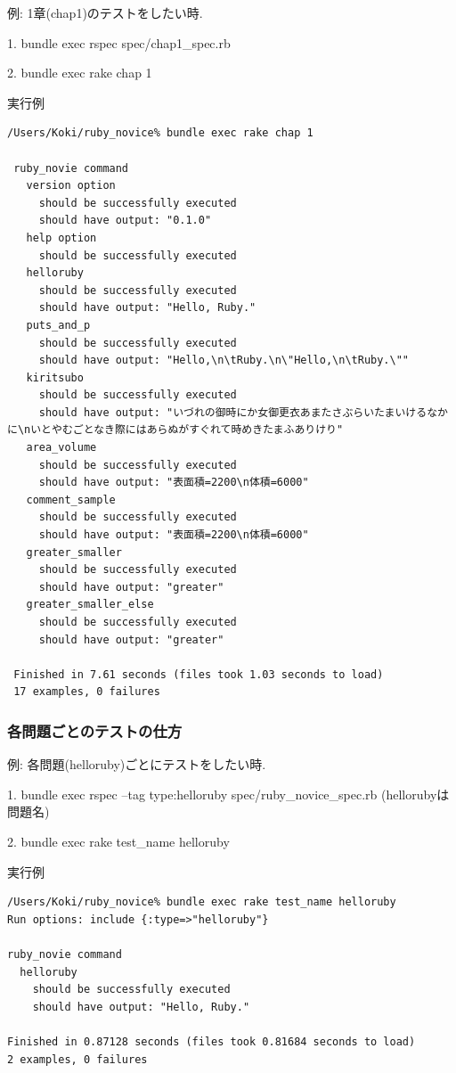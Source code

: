 例: 1章(chap1)のテストをしたい時.

1. bundle exec rspec spec/chap1\_spec.rb

2. bundle exec rake chap 1

実行例

\begin{lstlisting}[style=customRuby,basicstyle={\scriptsize\ttfamily}]
 /Users/Koki/ruby_novice% bundle exec rake chap 1   
 
 ruby_novie command
   version option
     should be successfully executed
     should have output: "0.1.0"
   help option
     should be successfully executed
   helloruby
     should be successfully executed
     should have output: "Hello, Ruby."
   puts_and_p
     should be successfully executed
     should have output: "Hello,\n\tRuby.\n\"Hello,\n\tRuby.\""
   kiritsubo
     should be successfully executed
     should have output: "いづれの御時にか女御更衣あまたさぶらいたまいけるなかに\nいとやむごとなき際にはあらぬがすぐれて時めきたまふありけり"
   area_volume
     should be successfully executed
     should have output: "表面積=2200\n体積=6000"
   comment_sample
     should be successfully executed
     should have output: "表面積=2200\n体積=6000"
   greater_smaller
     should be successfully executed
     should have output: "greater"
   greater_smaller_else
     should be successfully executed
     should have output: "greater"
		 
 Finished in 7.61 seconds (files took 1.03 seconds to load)
 17 examples, 0 failures
\end{lstlisting}
\subsubsection{各問題ごとのテストの仕方}
例: 各問題(helloruby)ごとにテストをしたい時.

1. bundle exec rspec --tag type:helloruby spec/ruby\_novice\_spec.rb  (hellorubyは問題名)

2. bundle exec rake test\_name helloruby

実行例
\begin{lstlisting}[style=customRuby,basicstyle={\scriptsize\ttfamily}]
/Users/Koki/ruby_novice% bundle exec rake test_name helloruby
Run options: include {:type=>"helloruby"}

ruby_novie command
  helloruby
    should be successfully executed
    should have output: "Hello, Ruby."
		 
Finished in 0.87128 seconds (files took 0.81684 seconds to load)
2 examples, 0 failures
\end{lstlisting}

